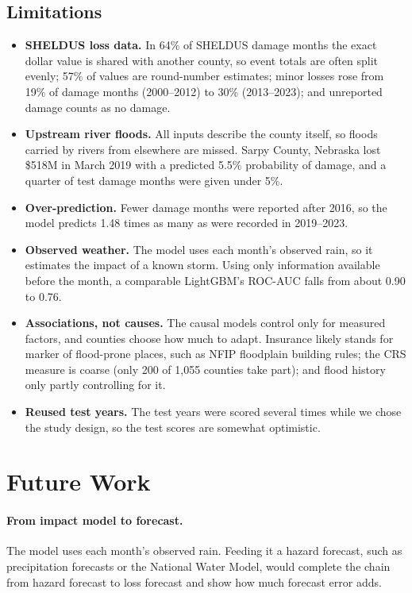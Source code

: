 \documentclass[10pt,twocolumn]{article}
\begin{document}
\subsection{Limitations}

\begin{itemize}
  \item \textbf{SHELDUS loss data.} In 64\% of SHELDUS damage months the exact dollar value is
        shared with another county, so event totals are often split evenly; 57\% of values are
        round-number estimates; minor losses rose from 19\% of damage months (2000--2012) to 30\%
        (2013--2023); and unreported damage counts as no damage.
  \item \textbf{Upstream river floods.} All inputs describe the county itself, so floods carried
        by rivers from elsewhere are missed. Sarpy County, Nebraska lost \$518M in March 2019 with
        a predicted 5.5\% probability of damage, and a quarter of test damage months were given
        under 5\%.
\item \textbf{Over-prediction.} Fewer damage months were reported after 2016, so the model
        predicts 1.48 times as many as were recorded in 2019--2023. 
  \item \textbf{Observed weather.} The model uses each month's observed rain, so it estimates the
        impact of a known storm. Using only information available before the month, a comparable
        LightGBM's ROC-AUC falls from about 0.90 to 0.76.
  \item \textbf{Associations, not causes.} The causal models control only for measured
        factors, and counties choose how much to adapt. Insurance likely stands for marker of flood-prone places, such as NFIP floodplain building rules; the CRS measure is coarse (only 200
        of 1{,}055 counties take part); and flood history only partly controlling for it.
\item \textbf{Reused test years.} The test years were scored several times while we chose the study design, so the test scores are somewhat optimistic.
\end{itemize}


\section{Future Work}
\label{sec:future}

\paragraph{From impact model to forecast.} The model uses each month's observed rain. Feeding it
a hazard forecast, such as precipitation forecasts or the National Water Model, would complete the
chain from hazard forecast to loss forecast and show how much forecast error adds.
\end{document}
